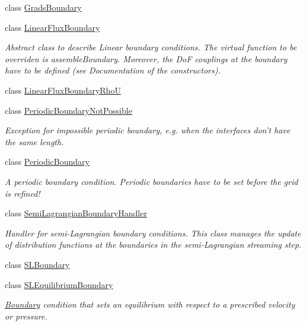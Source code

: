 \begin{DoxyCompactItemize}
class \hyperlink{classnatrium_1_1GradsBoundary}{GradsBoundary}
\item 
class \hyperlink{classnatrium_1_1LinearFluxBoundary}{LinearFluxBoundary}
\begin{DoxyCompactList}\small\item\em Abstract class to describe Linear boundary conditions. The virtual function to be overriden is assembleBoundary. Moreover, the DoF couplings at the boundary have to be defined (see Documentation of the constructors). \item\end{DoxyCompactList}\item 
class \hyperlink{classnatrium_1_1LinearFluxBoundaryRhoU}{LinearFluxBoundaryRhoU}
\item 
class \hyperlink{classnatrium_1_1PeriodicBoundaryNotPossible}{PeriodicBoundaryNotPossible}
\begin{DoxyCompactList}\small\item\em Exception for impossible periodic boundary, e.g. when the interfaces don't have the same length. \item\end{DoxyCompactList}\item 
class \hyperlink{classnatrium_1_1PeriodicBoundary}{PeriodicBoundary}
\begin{DoxyCompactList}\small\item\em A periodic boundary condition. Periodic boundaries have to be set before the grid is refined! \item\end{DoxyCompactList}\item 
class \hyperlink{classnatrium_1_1SemiLagrangianBoundaryHandler}{SemiLagrangianBoundaryHandler}
\begin{DoxyCompactList}\small\item\em Handler for semi-\/Lagrangian boundary conditions. This class manages the update of distribution functions at the boundaries in the semi-\/Lagrangian streaming step. \item\end{DoxyCompactList}\item 
class \hyperlink{classnatrium_1_1SLBoundary}{SLBoundary}
\item 
class \hyperlink{classnatrium_1_1SLEquilibriumBoundary}{SLEquilibriumBoundary}
\begin{DoxyCompactList}\small\item\em \hyperlink{classnatrium_1_1Boundary}{Boundary} condition that sets an equilibrium with respect to a prescribed velocity or pressure. \item\end{DoxyCompactList}\item 

\end{DoxyCompactItemize}
